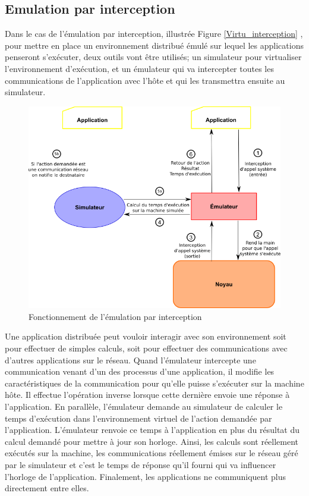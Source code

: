 \subsection{Emulation par interception}
\label{section:interception}

Dans le cas de l'émulation par interception, illustrée
Figure \ref{Virtu_interception} , pour mettre en place un environnement distribué
émulé sur lequel les applications penseront s'exécuter, deux outils vont être
utilisés; un simulateur pour virtualiser l'environnement d'exécution, et un
émulateur qui va intercepter toutes les communications de l'application avec l'hôte
et qui les transmettra ensuite au simulateur.

 \begin{figure}[H]
   \centering \includegraphics[scale=0.5]{Pictures/png/Emulation_fonctionnement}
   \caption{Fonctionnement de l'émulation par interception}
   \label{INTERCEPTION}
 \end{figure}
 
 Une application distribuée peut vouloir interagir avec son environnement soit
 pour effectuer de simples calculs, soit pour effectuer des communications avec
 d'autres applications sur le réseau. Quand l'émulateur intercepte une
 communication venant d'un des processus d'une application, il modifie les
 caractéristiques de la communication pour qu'elle puisse s'exécuter sur la
 machine hôte. Il effectue l'opération inverse lorsque cette dernière envoie une réponse à
 l'application. En parallèle, l'émulateur demande au simulateur de calculer le
 temps d'exécution dans l'environnement virtuel de l'action
 demandée par l'application. L'émulateur renvoie ce temps à l'application en plus
 du résultat du calcul demandé pour mettre à jour son horloge. Ainsi, les
 calculs sont réellement exécutés sur la machine, les communications réellement
 émises sur le réseau géré par le simulateur et c'est le temps de réponse qu'il
 fourni qui va influencer l'horloge de l'application. Finalement, les
 applications ne communiquent plus directement entre elles.

\vspace{0.5cm}
